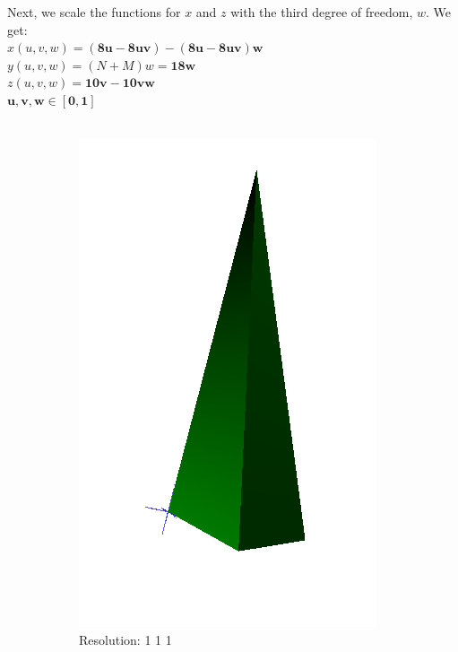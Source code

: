 \documentclass[acmlarge,nonacm=true]{acmart}
\begin{document}
Next, we scale the functions for \(x\) and \(z\) with the third degree of freedom, \(w\). We get:\\
\(x(u,v,w) = \mathbf{(8u - 8uv) - (8u - 8uv)w}\)\\
\(y(u,v,w) = (N+M)w = \textbf{18w}\)\\
\(z(u,v,w) = \mathbf{10v - 10vw}\)\\
\(\mathbf{u,v,w \in [0,1]}\)\\\\
\begin{figure}[H]
	\begin{subfigure}{.33\textwidth}
	  \centering
	  \includegraphics[width=.8\linewidth]{fig/1b1_1_1}
	  \caption{Resolution: 1 1 1}
	\end{subfigure}%
	\begin{subfigure}{.33\textwidth}
	  \centering

\end{subfigure}
\end{figure}
\end{document}
